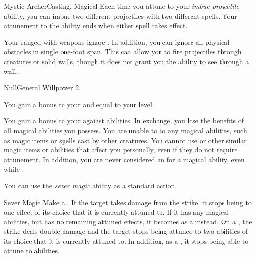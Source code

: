 \begin{magicalfeat}{Mystic Archer}{Casting, Magical}
         Each time you attune to your \textit{imbue projectile} ability, you can imbue two different projectiles with two different spells.
        Your attunement to the ability ends when either spell takes effect.

         Your ranged  with  weapons ignore .
        In addition, you can ignore all physical obstacles in single one-foot span.
        This can allow you to fire projectiles through creatures or solid walls, though it does not grant you the ability to see through a wall.
    \end{magicalfeat}

    \begin{feat}{Null}{General}
        \featpre Willpower 2.

         You gain a bonus to your  and  equal to your level.

         You gain a  bonus to your  against \magical abilities.
        In exchange, you lose the benefits of all magical abilities you possess.
        You are unable to  to any magical abilities, such as magic items or spells cast by other creatures.
        You cannot use  or other similar magic items or abilities that affect you personally, even if they do not require attunement.
        In addition, you are never considered an  for a magical ability, even while \unconscious.

         You can use the \textit{sever magic} ability as a standard action.
        \begin{activeability}{Sever Magic}
            \rankline
            Make a .
            If the target takes damage from the strike, it stops being  to one effect of its choice that it is currently attuned to.
            If it has any magical abilities, but has no remaining attuned effects, it becomes \stunned as a  instead.
            On a , the strike deals double damage and the target stops being attuned to two abilities of its choice that it is currently attuned to.
            In addition, as a , it stops being able to attune to abilities.


\end{activeability}
\end{feat}
